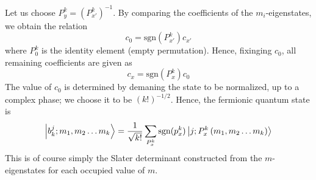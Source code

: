 \documentclass[12pt]{article}
\newcommand{\sgn}{\text{sgn}}
\begin{document}
	Let us choose $P^k_y=\left(P^k_{x'}\right)^{-1}$. By comparing the coefficients of the $m_i$-eigenstates, we obtain the relation
	$$c_0=\sgn(P^k_{x'})c_{x'}$$
	where $P^k_0$ is the identity element (empty permutation). 	Hence, fixinging $c_0$, all remaining coefficients are given as
	$$c_x=\sgn(P^k_x)c_0$$
	The value of $c_0$ is determined by demaning the state to be normalized, up to a complex phase; we choose it to be $(k!)^{-1/2}$. Hence, the fermionic quantum state is
	\begin{equation} \label{slater_determinant}
	\ket{b^j_k; m_1, m_2\dots m_k}=\frac{1}{\sqrt{k!}}\sum_{P^k_x}\sgn(p^k_x)\ket{j; P^k_x\left(m_1, m_2\dots m_k\right)}
	\end{equation}
	This is of course simply the Slater determinant constructed from the $m$-eigenstates for each occupied value of $m$.
	
\end{document}
